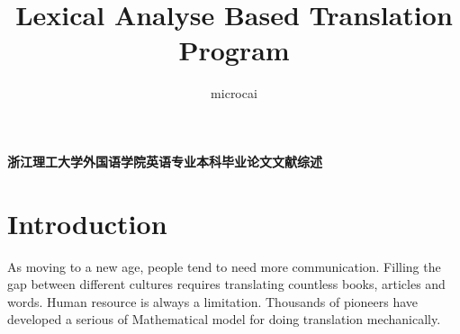 \documentclass[12pt,a4paper]{article}
\title{Lexical Analyse Based Translation Program}
\author{microcai}
\newcommand{\SONG}[1]{
{%
\begin{CJK}{UTF8}{gbsn}
#1%
\end{CJK}%
}}
\begin{document}
\begin{CJK}{UTF8}{gbsn}
\fontsize{14}{14}
\textbf{浙江理工大学外国语学院英语专业本科毕业论文文献综述}
\end{CJK}

\begin{table}[here]
\end{table} 

\newpage

\section{Introduction}

As moving to a new age, people tend to need more communication. Filling the gap between different cultures requires translating countless books, articles and words. Human resource is always a limitation. Thousands of 
pioneers have developed a serious of Mathematical model for doing translation mechanically. 
\end{document}
